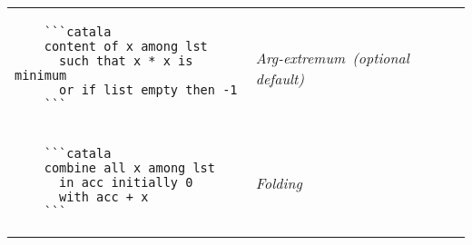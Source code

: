 \documentclass{article}
\makeatletter
\newenvironment{catala}{%
  \VerbatimEnvironment
  \let\FV@ListVSpace\relax
  \begin{verbatim}}%
 {\end{verbatim}}
\makeatother
\begin{document}
\begin{multicols}{3}
\begin{tabular}{@{}p{\cola}>{\slshape}p{\colb}@{}}
  \\
  \begin{catala}
    ```catala
    content of x among lst
      such that x * x is minimum
      or if list empty then -1
    ```
  \end{catala}
  & Arg-extremum\newline ~\newline (optional default)
  \\
  \begin{catala}
    ```catala
    combine all x among lst
      in acc initially 0
      with acc + x
    ```
  \end{catala}
  & Folding
  \\
\end{tabular}

\end{multicols}
\end{document}
